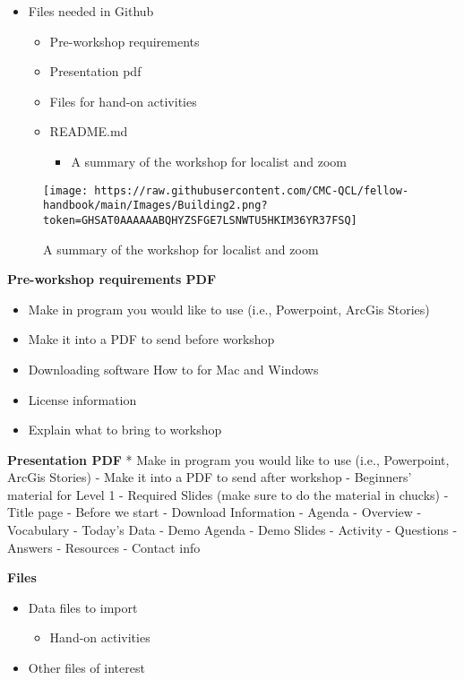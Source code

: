 \documentclass[
]{book}
\providecommand{\tightlist}{%
  \setlength{\itemsep}{0pt}\setlength{\parskip}{0pt}}
\begin{document}
\begin{itemize}
\tightlist
\item
  Files needed in Github

  \begin{itemize}
  \tightlist
  \item
    Pre-workshop requirements
  \item
    Presentation pdf
  \item
    Files for hand-on activities
  \item
    README.md

    \begin{itemize}
    \tightlist
    \item
      A summary of the workshop for localist and zoom
    \end{itemize}
  \end{itemize}
\end{itemize}

\begin{figure}
\centering
\texttt{[image: https://raw.githubusercontent.com/CMC-QCL/fellow-handbook/main/Images/Building2.png?token=GHSAT0AAAAAABQHYZSFGE7LSNWTU5HKIM36YR37FSQ]}
\caption{A summary of the workshop for localist and zoom}
\end{figure}

\textbf{Pre-workshop requirements PDF}

\begin{itemize}
\tightlist
\item
  Make in program you would like to use (i.e., Powerpoint, ArcGis Stories)
\item
  Make it into a PDF to send before workshop
\item
  Downloading software How to for Mac and Windows
\item
  License information
\item
  Explain what to bring to workshop
\end{itemize}

\textbf{Presentation PDF}
* Make in program you would like to use (i.e., Powerpoint, ArcGis Stories)
- Make it into a PDF to send after workshop
- Beginners' material for Level 1
- Required Slides (make sure to do the material in chucks)
- Title page
- Before we start
- Download Information
- Agenda
- Overview
- Vocabulary
- Today's Data
- Demo Agenda
- Demo Slides
- Activity
- Questions
- Answers
- Resources
- Contact info

\textbf{Files}

\begin{itemize}
\tightlist
\item
  Data files to import

  \begin{itemize}
  \tightlist
  \item
    Hand-on activities
  \end{itemize}
\item
  Other files of interest
\end{itemize}
\end{document}
